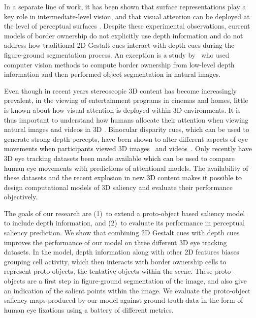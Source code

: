 In a separate line of work, it has been shown that surface representations play a key role in intermediate-level vision, and that
visual attention can be deployed at the level of perceptual surfaces
\citep[][for a model of attention to surfaces see Hu ]{He_Nakayama92,He_Nakayama95}.\nocite{Hu_etal15a} Despite these experimental observations, current models of border ownership do not explicitly use depth information and do not address how traditional 2D Gestalt cues interact with depth cues during the figure-ground segmentation process. An exception is a study by~\cite{Mishra_etal12} who used computer vision methods to compute border ownership from low-level depth information and then performed object segmentation in natural images.

Even though in recent years stereoscopic 3D content has become increasingly prevalent, \eg in the viewing of entertainment programs
in cinemas and homes, little is known about how visual attention is
deployed within 3D environments.  It is thus important to understand
how humans allocate their attention when viewing natural images and
videos in 3D \citep{LeCallet_Niebur13}. Binocular disparity cues, which can be used to generate strong depth percepts, have been shown to alter different aspects of eye movements when participants viewed 3D images~\citep{Jansen_etal09} and videos~\citep{Huynh_Schiatti11}. Only recently have 3D eye tracking datasets been made available which can be used to compare human eye movements with predictions of attentional models. The availability of these datasets and the recent explosion in new 3D content makes it possible to design computational models of 3D saliency and evaluate their performance objectively.

The goals of our research are (1)~to extend a proto-object based saliency model \citep{Russell_etal14} to include depth information, and (2)~to evaluate its performance in perceptual saliency prediction. We show that combining 2D Gestalt cues with depth cues improves the performance of our model on three different 3D eye tracking datasets. In the model, depth information along with other 2D features biases grouping cell activity, which then interacts with border ownership cells to represent proto-objects, the tentative objects within the scene. These proto-objects are a first step in figure-ground segmentation of the image, and also give an indication of the salient points within the image. We evaluate the proto-object saliency maps produced by our model against ground truth data in the form of human eye fixations using a battery of different metrics.

